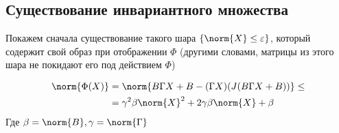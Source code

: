 \subsection{Существование инвариантного множества}
Покажем сначала существование такого шара \( \{ \norm{X} \leq \varepsilon \} \),
который содержит свой образ при отображении \( \Phi \)
(другими словами, матрицы из этого шара
 не покидают его под действием \( \Phi \))

\begin{align*}
    \norm{\Phi(X)} &= \norm{B \Gamma X + B - (\Gamma X) (J(B\Gamma X + B))} \leq \\
    &= \gamma^2\beta\norm{X}^2 + 2\gamma\beta\norm{X} + \beta
\end{align*}
Где \( \beta=\norm{B}, \gamma=\norm{\Gamma} \)

